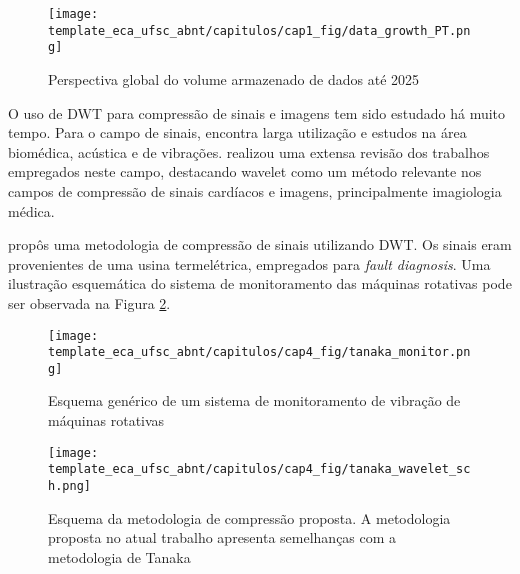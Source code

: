 \begin{figure}[htb]
	\caption{Perspectiva global do volume armazenado de dados até 2025}
	\begin{center}
		\texttt{[image: template\_eca\_ufsc\_abnt/capitulos/cap1\_fig/data\_growth\_PT.png]}
	\end{center}
	\label{fig:aumento_data}
\end{figure}









O uso de \gls{DWT} para compressão de sinais e imagens tem sido estudado há muito tempo. Para o campo de sinais, encontra larga utilização e estudos na área biomédica, acústica e de vibrações. \cite{art:resumo_compression_techniques} realizou uma extensa revisão dos trabalhos empregados neste campo, destacando wavelet como um método relevante nos campos de compressão de sinais cardíacos e imagens, principalmente imagiologia médica.

\cite{art:tanaka} propôs uma metodologia de compressão de sinais utilizando \gls{DWT}. Os sinais eram provenientes de uma usina termelétrica, empregados para \textit{fault diagnosis}. Uma ilustração esquemática do sistema de monitoramento das máquinas rotativas pode ser observada na Figura \ref{fig:tanaka_fault_diagnosis}.

\begin{figure}[htb]
	\caption{Esquema genérico de um sistema de monitoramento de vibração de máquinas rotativas}
	\begin{center}
		\texttt{[image: template\_eca\_ufsc\_abnt/capitulos/cap4\_fig/tanaka\_monitor.png]}
	\end{center}
	\label{fig:tanaka_fault_diagnosis}
\end{figure}

\begin{figure}[htb]
	\caption{Esquema da metodologia de compressão proposta. A metodologia proposta no atual trabalho apresenta semelhanças com a metodologia de Tanaka}
	\begin{center}
		\texttt{[image: template\_eca\_ufsc\_abnt/capitulos/cap4\_fig/tanaka\_wavelet\_sch.png]}
	\end{center}
	\label{fig:tanaka_wavelet_sch}
\end{figure}

